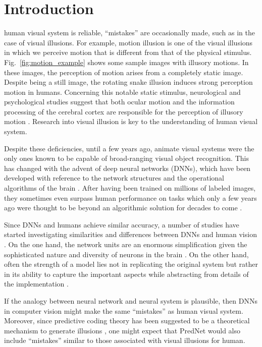 \documentclass[journal]{IEEEtran}
\begin{document}
  
  \IEEEpeerreviewmaketitle
  
  
  \section{Introduction}
  \label{sec:intro}
  
   human visual system is reliable, ``mistakes'' are occasionally made, such as in the case of visual illusions. For example, motion illusion is one of the visual illusions in which we perceive motion that is different from that of the physical stimulus. Fig.~\ref{fig:motion_example} shows some sample images with illusory motions. In these images, the perception of motion arises from a completely static image. Despite being a still image, the rotating snake illusion induces strong perception motion in humans. Concerning this notable static stimulus, neurological and psychological studies suggest that both ocular motion and the information processing of the cerebral cortex are responsible for the perception of illusory motion \cite{HISAKATA20081940}. Research into visual illusion is key to the understanding of human visual system.
  
  Despite these deficiencies, until a few years ago, animate visual systems were the only ones known to be capable of broad-ranging visual object recognition. This has changed with the advent of deep neural networks (DNNs), which have been developed with reference to the network structures and the operational algorithms of the brain \cite{geirhos2018generalisation}. After having been trained on millions of labeled images, they sometimes even surpass human performance on tasks which only a few years ago were thought to be beyond an algorithmic solution for decades to come \cite{he2015delving, silver2016mastering}.
  
  Since DNNs and humans achieve similar accuracy, a number of studies have started investigating similarities and differences between DNNs and human vision \cite{cadieu2014deep, yamins2014performance, cichy2017dynamics}. On the one hand, the network units are an enormous simplification given the sophisticated nature and diversity of neurons in the brain .  On the other hand, often the strength of a model lies not in replicating the original system but rather in its ability to capture the important aspects while abstracting from details of the implementation \cite{kriegeskorte2015deep}.
  
  If the analogy between neural network and neural system is plausible, then DNNs in computer vision might make the same ``mistakes'' as human visual system. Moreover, since predictive coding theory has been suggested to be a theoretical mechanism to generate illusions \cite{notredame2014visual}, one might expect that PredNet would also include ``mistakes'' similar to those associated with visual illusions for human.
  
\end{document}
